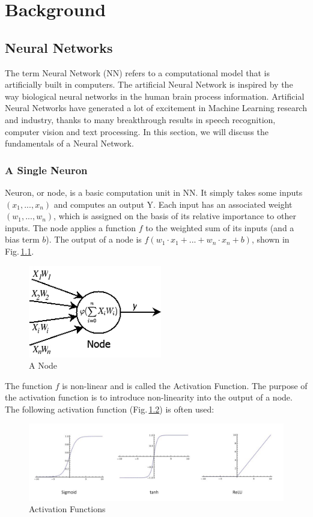 \chapter{Background} 
\label{background} 

\section{Neural Networks}

The term Neural Network (NN) refers to a computational model that is artificially built in computers. The artificial Neural Network is inspired by the way biological neural networks in the human brain process information. Artificial Neural Networks have generated a lot of excitement in Machine Learning research and industry, thanks to many breakthrough results in speech recognition, computer vision and text processing. In this section, we will discuss the fundamentals of a Neural Network.

\subsection{A Single Neuron}
Neuron, or node, is a basic computation unit in NN. It simply takes some inputs $(x_1,...,x_n)$ and computes an output Y. Each input has an associated weight $(w_1,...,w_n)$, which is assigned on the basis of its relative importance to other inputs. The node applies a function $f$ to the weighted sum of its inputs (and a bias term $b$). The output of a node is $f(w_1 \cdot x_1 +...+ w_n \cdot x_n + b)$, shown in Fig.\,\ref{node}.
\begin{figure}
	\centering
	\includegraphics[scale=0.5]{Figs/node.png}
    \caption{A Node}
    \label{node}
\end{figure}

The function $f$ is non-linear and is called the Activation Function. The purpose of the activation function is to introduce non-linearity into the output of a node. The following activation function (Fig.\,\ref{activation}) is often used:
\begin{figure}
	\centering
	\includegraphics[scale=0.5]{Figs/activation.png}
    \caption{Activation Functions}
    \label{activation}
\end{figure}


